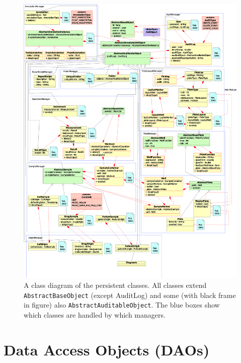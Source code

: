 \documentclass[a4paper,10pt]{article}
\begin{document}
    \begin{figure}[hp]
        \begin{center}
            \includegraphics[width=1\textwidth]{UML/classDiagram.eps}
        \end{center}
        \caption{A class diagram of the persistent classes. All classes extend
            \texttt{AbstractBaseObject} (except AuditLog) and some (with black
            frame in figure) also \texttt{AbstractAuditableObject}. The blue
            boxes show which classes are handled by which managers.}
        \label{classdiagram}
    \end{figure}

	\section{Data Access Objects (DAOs)}
	
\end{document}
